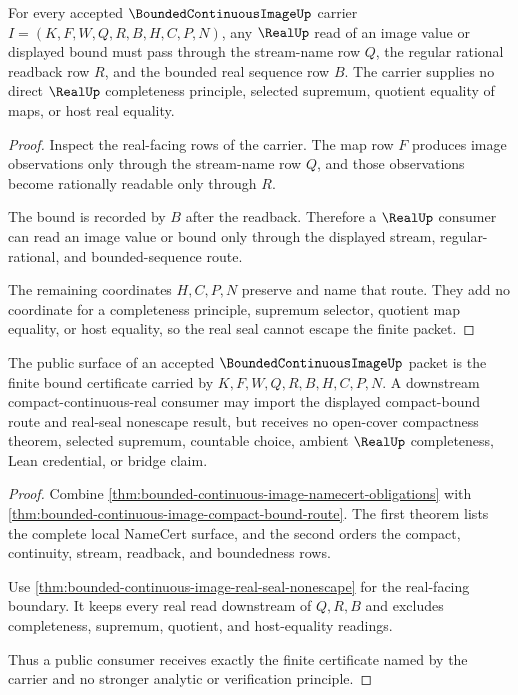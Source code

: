 \begin{theorem}
\label{thm:bounded-continuous-image-real-seal-nonescape}
For every accepted $\BoundedContinuousImageUp$ carrier $I=(K,F,W,Q,R,B,H,C,P,N)$, any $\RealUp$ read of an image value or displayed bound must pass through the stream-name row $Q$, the regular rational readback row $R$, and the bounded real sequence row $B$. The carrier supplies no direct $\RealUp$ completeness principle, selected supremum, quotient equality of maps, or host real equality.
\end{theorem}
\begin{proof}
Inspect the real-facing rows of the carrier. The map row $F$ produces image observations only through the stream-name row $Q$, and those observations become rationally readable only through $R$.

The bound is recorded by $B$ after the readback. Therefore a $\RealUp$ consumer can read an image value or bound only through the displayed stream, regular-rational, and bounded-sequence route.

The remaining coordinates $H,C,P,N$ preserve and name that route. They add no coordinate for a completeness principle, supremum selector, quotient map equality, or host equality, so the real seal cannot escape the finite packet.
\end{proof}

\begin{theorem}
\label{thm:bounded-continuous-image-public-export}
The public surface of an accepted $\BoundedContinuousImageUp$ packet is the finite bound certificate carried by $K,F,W,Q,R,B,H,C,P,N$. A downstream compact-continuous-real consumer may import the displayed compact-bound route and real-seal nonescape result, but receives no open-cover compactness theorem, selected supremum, countable choice, ambient $\RealUp$ completeness, Lean credential, or bridge claim.
\end{theorem}
\begin{proof}
Combine \autoref{thm:bounded-continuous-image-namecert-obligations} with \autoref{thm:bounded-continuous-image-compact-bound-route}. The first theorem lists the complete local NameCert surface, and the second orders the compact, continuity, stream, readback, and boundedness rows.

Use \autoref{thm:bounded-continuous-image-real-seal-nonescape} for the real-facing boundary. It keeps every real read downstream of $Q,R,B$ and excludes completeness, supremum, quotient, and host-equality readings.

Thus a public consumer receives exactly the finite certificate named by the carrier and no stronger analytic or verification principle.
\end{proof}

